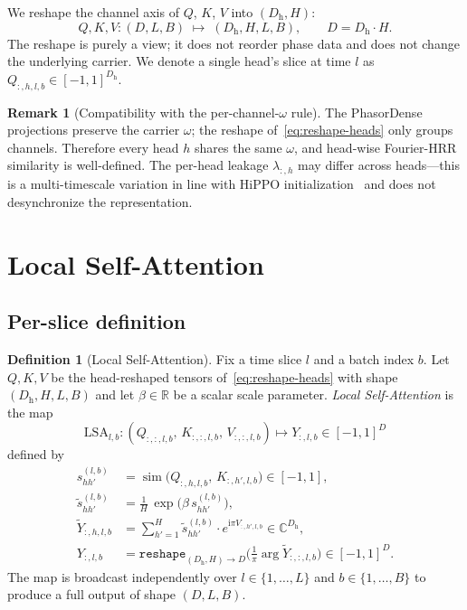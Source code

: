 \documentclass[11pt]{article}
\newcommand{\R}{\mathbb{R}}
\newcommand{\C}{\mathbb{C}}
\newcommand{\im}{\mathrm{i}}
\newcommand{\nh}{H}              %
\newcommand{\Dh}{D_{\mathrm{h}}} %
\newcommand{\sm}{\operatorname{sim}}
\theoremstyle{definition}
\newtheorem{definition}{Definition}
\newtheorem{remark}{Remark}
\begin{document}
We reshape the channel axis of $Q$, $K$, $V$ into $(\Dh, \nh)$:
\begin{equation}\label{eq:reshape-heads}
  Q,K,V\colon (D, L, B) \;\longmapsto\; (\Dh, \nh, L, B), \qquad
  D = \Dh\cdot \nh.
\end{equation}
The reshape is purely a view; it does not reorder phase data and does
not change the underlying carrier. We denote a single head's slice at
time $l$ as $Q_{:,h,l,b}\in[-1,1]^{\Dh}$.

\begin{remark}[Compatibility with the per-channel-$\omega$ rule]
The PhasorDense projections preserve the carrier $\omega$; the reshape
of~\eqref{eq:reshape-heads} only groups channels. Therefore every head
$h$ shares the same $\omega$, and head-wise Fourier-HRR similarity is
well-defined. The per-head leakage $\lambda_{:,h}$ may differ across
heads---this is a multi-timescale variation in line with HiPPO
initialization~\cite{hippo} and does not desynchronize the
representation.
\end{remark}

\section{Local Self-Attention}\label{sec:lsa}

\subsection{Per-slice definition}

\begin{definition}[Local Self-Attention]\label{def:lsa}
Fix a time slice $l$ and a batch index $b$. Let $Q,K,V$ be the
head-reshaped tensors of~\eqref{eq:reshape-heads} with shape
$(\Dh, \nh, L, B)$ and let $\beta\in\R$ be a scalar scale parameter.
\emph{Local Self-Attention} is the map
\[
  \mathrm{LSA}_{l,b}\colon
    (Q_{:,:,l,b},\,K_{:,:,l,b},\,V_{:,:,l,b})
    \longmapsto Y_{:,l,b}\in[-1,1]^D
\]
defined by
\begin{align}
  s_{h h'}^{(l,b)}
    &= \sm\!\bigl(Q_{:,h,l,b},\, K_{:,h',l,b}\bigr)
       \in [-1, 1],
       \label{eq:lsa-score} \\
  \tilde s_{h h'}^{(l,b)}
    &= \frac{1}{\nh}\,\exp\!\bigl(\beta\,s_{h h'}^{(l,b)}\bigr),
       \label{eq:lsa-scale} \\
  \tilde Y_{:,h,l,b}
    &= \sum_{h'=1}^{\nh} \tilde s_{h h'}^{(l,b)}
       \cdot e^{\im\pi V_{:,h',l,b}}
       \in \C^{\Dh},
       \label{eq:lsa-mix} \\
  Y_{:,l,b}
    &= \texttt{reshape}_{(\Dh,\nh)\to D}\!\bigl(
         \tfrac{1}{\pi}\arg \tilde Y_{:,:,l,b}\bigr)
       \in [-1,1]^D.
       \label{eq:lsa-reduce}
\end{align}
The map is broadcast independently over $l\in\{1,\dots,L\}$ and
$b\in\{1,\dots,B\}$ to produce a full output of shape $(D, L, B)$.
\end{definition}
\end{document}
